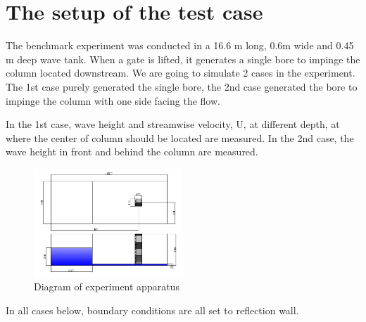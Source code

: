\documentclass[11pt]{article}
\begin{document}
\section{The setup of the test case}\label{Sec:Setup}
The benchmark experiment was conducted in a 16.6 m long, 0.6m wide and 0.45 m deep wave tank. When a gate is lifted, it generates a single bore to impinge the column located downstream.
We are going to simulate 2 cases in the experiment. The 1st case purely generated the single bore, the 2nd case generated the bore to impinge the column with one side facing the flow.
\par
In the 1st case, wave height and streamwise velocity, U, at different depth, at where the center of column should be located are measured. In the 2nd case, the wave height in front and behind the column are measured.
        \begin{figure}[h!]
            \centering
            \includegraphics[width=0.5\textwidth]{../proposal/figures/Diagram_case}
            \caption{Diagram of experiment apparatus}
        \end{figure}

In all cases below, boundary conditions are all set to reflection wall. 
\end{document}
